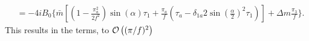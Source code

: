 \documentclass{article}
\begin{document}
\begin{align*}
    & = - 4 i B_0 \Bigg\{
        \bar m 
        \left[
            \left(
                1 - \frac{\pi_a^2}{2f^2}
            \right)
            \sin(\alpha) \tau_1
            +  \frac{\pi_a}{f}    \left(
                \tau_a 
                - \delta_{1a} 2 \sin(\frac{\alpha}{2})^2 \tau_1 
            \right)        
        \right]
        + \Delta m 
            \frac{\pi_3}{f}
    \Bigg\}.
\end{align*}
This results in the terms, to $\Oh[2]{(\pi/f)}$
\begingroup
\allowdisplaybreaks
\end{document}
